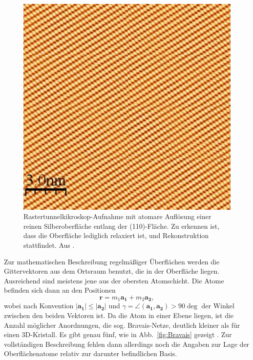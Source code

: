 \begin{figure}
    \includegraphics[width=1.0\textwidth]{pics/Ag(110)_clean}
    \caption{Rastertunnelkikroskop-Aufnahme mit atomare Auflösung einer reinen 
Silberoberfläche entlang der (110)-Fläche. Zu erkennen ist, dass die Oberfläche 
lediglich relaxiert ist, und Rekonstruktion stattfindet. 
Aus \cite{kahn:stm_images}.}
    \label{fig:Ag(100)}
\end{figure} 

Zur mathematischen Beschreibung regelmäßiger Überflächen werden die Gittervektoren 
aus dem Ortsraum benutzt, die in der Oberfläche liegen. Ausreichend sind meistens 
jene aus der obersten Atomschicht. Die Atome befinden sich dann an den Positionen 
\begin{equation}
    \mathbf{r} = m_1 \mathbf{a_1} + m_2 \mathbf{a_2},
\end{equation}
wobei nach Konvention $|\mathbf{a_1}| \le |\mathbf{a_2}|$ und 
$\gamma = \angle (\mathbf{a_1}, \mathbf{a_2}) > 90 \deg$ der Winkel zwischen den 
beiden Vektoren ist. Da die Atom in einer Ebene liegen, ist die Anzahl möglicher 
Anordnungen, die sog. Bravais-Netze, deutlich kleiner als für einen 3D-Kristall. 
Es gibt genau fünf, wie in Abb.~\ref{fig:Bravais} gezeigt 
\cite{henzler1991oberflachenphysik}.
Zur vollständigen Beschreibung fehlen dann allerdings noch die Angaben zur Lage 
der Oberflächenatome relativ zur darunter befindlichen Basis. 

